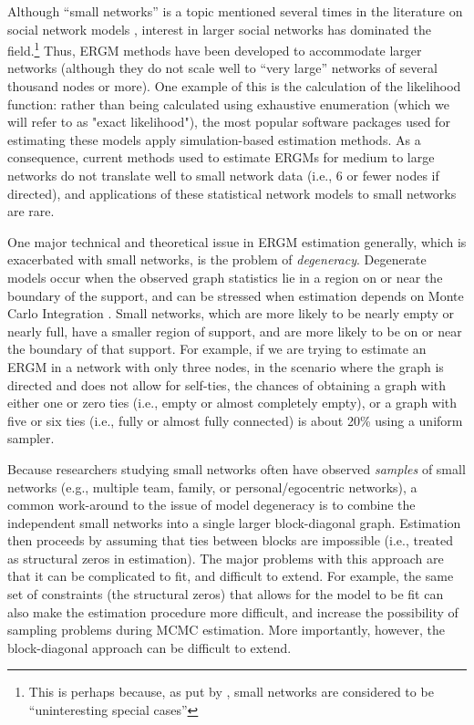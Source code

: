 \documentclass[review]{elsarticle}
\begin{document}
Although ``small networks'' is a topic mentioned several times in the literature on social network models  \cite{Wasserman1996,Frank1986,Snijders2011},  interest in larger social networks has dominated the field.\footnote{This is perhaps because, as put by \cite{Snijders2011}, small networks are considered to be ``uninteresting special cases''} Thus, ERGM methods have been developed to accommodate larger networks (although they do not scale well to ``very large'' networks of several thousand nodes or more). One example of this is the calculation of the likelihood function: rather than being calculated using exhaustive enumeration (which we will refer to as "exact likelihood"), the most popular software packages used for estimating these models apply simulation-based estimation methods. As a consequence, current methods used to estimate ERGMs for medium to large networks do not translate well to small network data (i.e., 6 or fewer nodes if directed), and applications of these statistical network models to small networks are rare.  

One major technical and theoretical issue in ERGM estimation generally, which is exacerbated with small networks, is the problem of \textit{degeneracy}. Degenerate models occur when the observed graph statistics lie in a region on or near the boundary of the support, and can be stressed when estimation depends on Monte Carlo Integration \cite{Strauss1986,Handcock2003}. Small networks, which are more likely to be nearly empty or nearly full, have a smaller region of support, and are more likely to be on or near the boundary of that support. For example, if we are trying to estimate an ERGM in a network with only three nodes, in the scenario where the graph is directed and does not allow for self-ties, the chances of obtaining a graph with either one or zero ties (i.e., empty or almost completely empty), or a graph with five or six ties (i.e., fully or almost fully connected) is about 20\% using a uniform sampler.

Because researchers studying small networks often have observed \textit{samples} of small networks (e.g., multiple team, family, or personal/egocentric networks), a common work-around to the issue of model degeneracy is to combine the independent small networks into a single larger block-diagonal graph. Estimation then proceeds by assuming that ties between blocks are impossible (i.e., treated as structural zeros in estimation). The major problems with this approach are that it can be complicated to fit, and difficult to extend. For example, the same set of constraints (the structural zeros) that allows for the model to be fit can also make the estimation procedure more difficult, and increase the possibility of sampling problems during MCMC estimation. More importantly, however, the block-diagonal approach can be difficult to extend. 
\end{document}
